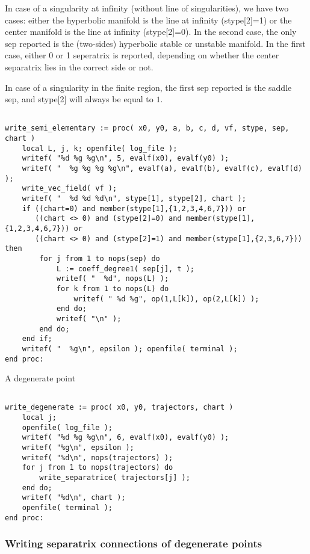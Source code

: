 \documentclass[a4paper,10pt]{article}
\begin{document}
In case of a singularity at infinity (without line of singularities), we have two cases: either the hyperbolic manifold is the line at infinity (stype[2]=1) or the center manifold is the line at infinity (stype[2]=0).  In the second case, the only sep reported is the (two-sides) hyperbolic stable or unstable manifold.  In the first case, either 0 or 1 seperatrix is reported, depending on whether the center separatrix lies in the correct side or not.

In case of a singularity in the finite region, the first sep reported is the saddle sep, and stype[2] will always be equal to $1$.

\begin{lstlisting}[name=writelog]

write_semi_elementary := proc( x0, y0, a, b, c, d, vf, stype, sep, chart )
    local L, j, k; openfile( log_file );
    writef( "%d %g %g\n", 5, evalf(x0), evalf(y0) );
    writef( "  %g %g %g %g\n", evalf(a), evalf(b), evalf(c), evalf(d) );
    write_vec_field( vf );
    writef( "  %d %d %d\n", stype[1], stype[2], chart );
    if ((chart=0) and member(stype[1],{1,2,3,4,6,7})) or
       ((chart <> 0) and (stype[2]=0) and member(stype[1],{1,2,3,4,6,7})) or
       ((chart <> 0) and (stype[2]=1) and member(stype[1],{2,3,6,7})) then
        for j from 1 to nops(sep) do
            L := coeff_degree1( sep[j], t );
            writef( "  %d", nops(L) );
            for k from 1 to nops(L) do
                writef( " %d %g", op(1,L[k]), op(2,L[k]) );
            end do;
            writef( "\n" );
        end do;
    end if;
    writef( "  %g\n", epsilon ); openfile( terminal );
end proc:
\end{lstlisting}

A degenerate point

\begin{lstlisting}[name=writelog]

write_degenerate := proc( x0, y0, trajectors, chart )
    local j;
    openfile( log_file );
    writef( "%d %g %g\n", 6, evalf(x0), evalf(y0) );
    writef( "%g\n", epsilon );
    writef( "%d\n", nops(trajectors) );
    for j from 1 to nops(trajectors) do
        write_separatrice( trajectors[j] );
    end do;
    writef( "%d\n", chart );
    openfile( terminal );
end proc:

\end{lstlisting}

\subsubsection{Writing separatrix connections of degenerate points}
\end{document}
